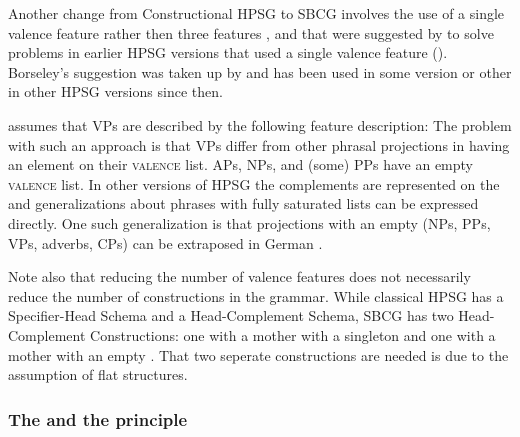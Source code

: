 Another change from Constructional HPSG to SBCG involves the use of a single valence feature rather
then three features \spr, \subj and \comps that were suggested by \citet{Borsley87a} to solve problems in
earlier HPSG versions that used a single valence feature (\subcat). Borseley's suggestion was taken up by
\citet[Chapter~9]{ps2} and has been used in some version or other in other HPSG versions since then. 

\citet[]{Sag2012a} assumes that VPs are described by the following
feature description:
\ea
{}
\z
The problem with such an approach is that VPs differ from other phrasal projections in having an
element on their \textsc{valence} list. APs, NPs, and (some) PPs have an empty \textsc{valence} list. In
other versions of HPSG the complements are represented on the \compsl and generalizations about
phrases with fully saturated \comps lists can be expressed directly. One such generalization is that
projections with an empty \compsl (NPs, PPs, VPs, adverbs, CPs) can be extraposed in German \citep[Section~13.1.2]{Mueller99a}.

Note also that reducing the number of valence features does not necessarily reduce the number of
constructions in the grammar. While classical HPSG has a Specifier-Head Schema and a Head-Complement
Schema, SBCG has two Head-Complement Constructions: one with a mother with a singleton \compsl and
one with a mother with an empty \compsl \citep[]{Sag2012a}. That two seperate constructions
are needed is due to the assumption of flat structures.

\subsubsection{The \headf and the \headf principle}

